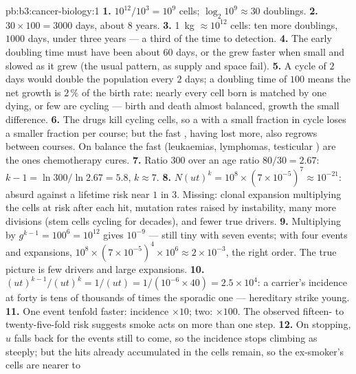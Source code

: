\begin{solution}{pb:b3:cancer-biology:1}
\textbf{1.} $10^{12}/10^{3} = 10^{9}$ cells; $\log_{2}10^{9} \approx 30$
doublings.
\textbf{2.} $30\times 100 = 3000$ days, about $8$ years.
\textbf{3.} \qty{1}{kg} $\approx 10^{12}$ cells: ten more doublings,
$1000$ days, under three years --- a third of the time to detection.
\textbf{4.} The early doubling time must have been about $60$ days, or
the  grew faster when small and slowed as it grew (the usual
pattern, as supply and space fail).
\textbf{5.} A cycle of $2$ days would double the population every $2$
days; a doubling time of $100$ means the net growth is $2\,\%$ of the
birth rate: nearly every cell born is matched by one dying, or few are
cycling --- birth and death almost balanced, growth the small
difference.
\textbf{6.} The drugs kill cycling cells, so a  with a small
fraction in cycle loses a smaller fraction per course; but the fast
, having lost more, also regrows between courses. On balance the
fast  (leukaemias, lymphomas, testicular ) are the ones
chemotherapy cures.
\textbf{7.} Ratio $300$ over an age ratio $80/30 = 2.67$: $k - 1 =
\ln 300/\ln 2.67 = 5.8$, $k \approx 7$.
\textbf{8.} $N(ut)^{k} = 10^{8}\times (7\times 10^{-5})^{7} \approx
10^{-21}$: absurd against a lifetime risk near $1$ in $3$. Missing:
clonal expansion multiplying the cells at risk after each hit, mutation
rates raised by instability, many more divisions (stem cells cycling
for decades), and fewer true drivers.
\textbf{9.} Multiplying by $g^{k-1} = 100^{6} = 10^{12}$ gives $10^{-9}$
--- still tiny with seven events; with four events and expansions,
$10^{8}\times (7\times 10^{-5})^{4}\times 10^{6} \approx 2\times
10^{-3}$, the right order. The true picture is few drivers and large
expansions.
\textbf{10.} $(ut)^{k-1}/(ut)^{k} = 1/(ut) = 1/(10^{-6}\times 40) =
2.5\times 10^{4}$: a carrier's incidence at forty is tens of thousands
of times the sporadic one --- hereditary  strike young.
\textbf{11.} One event tenfold faster: incidence $\times 10$; two:
$\times 100$. The observed fifteen- to twenty-five-fold risk suggests
smoke acts on more than one step.
\textbf{12.} On stopping, $u$ falls back for the events still to come,
so the incidence stops climbing as steeply; but the hits already
accumulated in the cells remain, so the ex-smoker's cells are nearer to

\end{solution}
